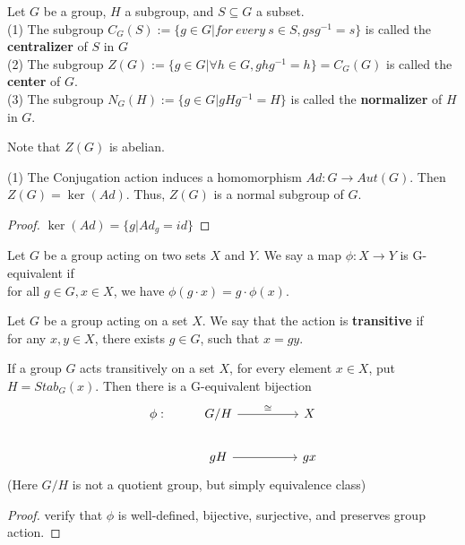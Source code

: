\documentclass[11pt,fleqn]{book} %
\begin{document}
\begin{CJK}{UTF8}{gkai}
\begin{definition}
	 Let $G$ be a group, $H$ a subgroup, and $S \subseteq G$ a subset.  \\
	(1) The subgroup $C_G(S) :=\{g\in G | for \ every \ s \in S, gsg^{-1} = s\}$ is called the {\bf centralizer} of $S$ in $G$\\
	(2) The subgroup $Z(G) :=\{g\in G | \forall h \in G, ghg^{-1} = h\} = C_G(G)$ is called the {\bf center} of $G$. \\
	(3) The subgroup $N_G(H) := \{g \in G | gHg^{-1} = H\}$ is called the {\bf normalizer} of $H$ in $G$.
\end{definition}

\begin{remark}
	Note that $Z(G)$ is abelian.
\end{remark}
\begin{proposition}
	(1) The Conjugation action induces a homomorphism $Ad: G \to Aut(G)$. Then $Z(G) = \ker (Ad)$. Thus, $Z(G)$ is a normal subgroup of $G$.
\end{proposition}
\begin{proof}
	$\ker (Ad) = \{g | Ad_g = id\}$	
\end{proof}

\begin{definition}
	[G-equivariant] Let $G$ be a group acting on two sets $X$ and $Y$. We say a map $\phi: X \to Y$ is G-equivalent if \\
	for all $g\in G, x \in X$, we have $\phi(g\cdot x) = g\cdot \phi(x)$.
\end{definition}

\begin{definition}
	[transitive] Let $G$ be a group acting on a set $X$. We say that the action is {\bf transitive} if \\
	for any $x,y \in X$, there exists $g \in G$, such that $x = gy$.
\end{definition}

\begin{proposition}
	If a group $G$ acts transitively on a set $X$, for every element $x \in X$, put $H = Stab_G(x)$. Then there is a G-equivalent bijection
	\[\begin{tikzcd}
		{\phi:} & {G/H} && X \\
		& gH && gx
		\arrow["\cong", from=1-2, to=1-4]
		\arrow[from=2-2, to=2-4]
	\end{tikzcd}\]
	(Here $G/H$ is not a quotient group, but simply equivalence class)
\end{proposition}
\begin{proof}
	verify that $\phi$ is well-defined, bijective, surjective, and preserves group action.
\end{proof}


\end{CJK}
\end{document}
